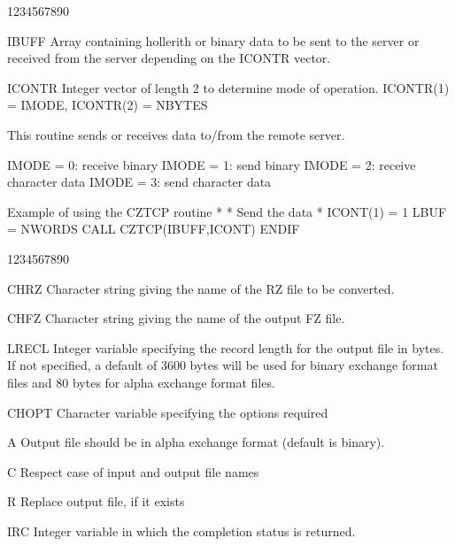 \begin{DLtt}{1234567890}
\item[IBUFF]Array containing hollerith or binary data to be sent to the server
or received from the server depending on the ICONTR vector.
\item[ICONTR]Integer vector of length 2 to determine mode of operation.
ICONTR(1) = IMODE, ICONTR(2) = NBYTES
\end{DLtt}
\par
This routine sends or receives data to/from the remote server.
\begin{XMP}IMODE = 0: receive binary
IMODE = 1: send binary
IMODE = 2: receive character data
IMODE = 3: send character data
\end{XMP}
\begin{XMPt}{Example of using the CZTCP routine}
*
*     Send the data
*
            ICONT(1) = 1
            LBUF     = NWORDS
            CALL CZTCP(IBUFF,ICONT)
            ENDIF

\end{XMPt}
\begin{DLtt}{1234567890}
\item[CHRZ]Character string giving the name of the RZ file
to be converted.
\item[CHFZ]Character string giving the name of the output
FZ file.
\item[LRECL]Integer variable specifying the record length
for the output file in bytes. If not specified, a default
of 3600 bytes will be used for binary exchange format files
and 80 bytes for alpha exchange format files.
\item[CHOPT]Character variable specifying the options required
\begin{DLtt}{12}
\item[A]Output file should be in alpha exchange format (default is binary).
\item[C]Respect case of input and output file names
\item[R]Replace output file, if it exists
\end{DLtt}
\item[IRC]Integer variable in which the completion status is
returned.
\end{DLtt}
\par
